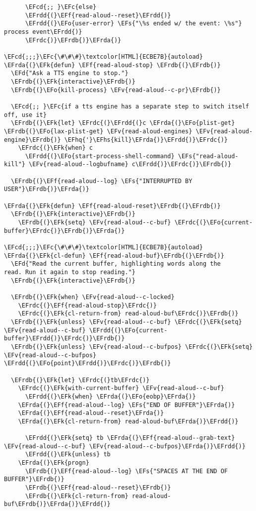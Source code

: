 \documentclass[a4wide,10pt]{article}
\newcommand{\EFc}[1]{\textcolor{EFc}{#1}} %
\newcommand{\EFcd}[1]{\textcolor{EFcd}{#1}} %
\newcommand{\EFs}[1]{\textcolor{EFs}{#1}} %
\newcommand{\EFd}[1]{\textcolor{EFd}{#1}} %
\newcommand{\EFk}[1]{\textcolor{EFk}{#1}} %
\newcommand{\EFf}[1]{\textcolor{EFf}{#1}} %
\newcommand{\EFv}[1]{\textcolor{EFv}{#1}} %
\newcommand{\EFo}[1]{\textcolor{EFo}{#1}} %
\newcommand{\EFhq}[1]{\textcolor{EFhq}{#1}} %
\newcommand{\EFhs}[1]{\textcolor{EFhs}{#1}} %
\newcommand{\EFrda}[1]{\textcolor{EFrda}{#1}} %
\newcommand{\EFrdb}[1]{\textcolor{EFrdb}{#1}} %
\newcommand{\EFrdc}[1]{\textcolor{EFrdc}{#1}} %
\newcommand{\EFrdd}[1]{\textcolor{EFrdd}{#1}} %
\begin{document}
\begin{Code}
\begin{Verbatim}
      \EFcd{;; }\EFc{else}
      \EFrdd{(}\EFf{read-aloud--reset}\EFrdd{)}
      \EFrdd{(}\EFo{user-error} \EFs{"\%s ended w/ the event: \%s"} process event\EFrdd{)}
      \EFrdc{)}\EFrdb{)}\EFrda{)}

\EFcd{;;;}\EFc{\#\#\#}\textcolor[HTML]{ECBE7B}{autoload}
\EFrda{(}\EFk{defun} \EFf{read-aloud-stop} \EFrdb{(}\EFrdb{)}
  \EFd{"Ask a TTS engine to stop."}
  \EFrdb{(}\EFk{interactive}\EFrdb{)}
  \EFrdb{(}\EFo{kill-process} \EFv{read-aloud--c-pr}\EFrdb{)}

  \EFcd{;; }\EFc{if a tts engine has a separate step to switch itself off, use it}
  \EFrdb{(}\EFk{let} \EFrdc{(}\EFrdd{(}c \EFrda{(}\EFo{plist-get} \EFrdb{(}\EFo{lax-plist-get} \EFv{read-aloud-engines} \EFv{read-aloud-engine}\EFrdb{)} \EFhq{'}\EFhs{kill}\EFrda{)}\EFrdd{)}\EFrdc{)}
    \EFrdc{(}\EFk{when} c
      \EFrdd{(}\EFo{start-process-shell-command} \EFs{"read-aloud-kill"} \EFv{read-aloud--logbufname} c\EFrdd{)}\EFrdc{)}\EFrdb{)}

  \EFrdb{(}\EFf{read-aloud--log} \EFs{"INTERRUPTED BY USER"}\EFrdb{)}\EFrda{)}

\EFrda{(}\EFk{defun} \EFf{read-aloud-reset}\EFrdb{(}\EFrdb{)}
  \EFrdb{(}\EFk{interactive}\EFrdb{)}
    \EFrdb{(}\EFk{setq} \EFv{read-aloud--c-buf} \EFrdc{(}\EFo{current-buffer}\EFrdc{)}\EFrdb{)}\EFrda{)}

\EFcd{;;;}\EFc{\#\#\#}\textcolor[HTML]{ECBE7B}{autoload}
\EFrda{(}\EFk{cl-defun} \EFf{read-aloud-buf}\EFrdb{(}\EFrdb{)}
  \EFd{"Read the current buffer, highlighting words along the
read. Run it again to stop reading."}
  \EFrdb{(}\EFk{interactive}\EFrdb{)}

  \EFrdb{(}\EFk{when} \EFv{read-aloud--c-locked}
    \EFrdc{(}\EFf{read-aloud-stop}\EFrdc{)}
    \EFrdc{(}\EFk{cl-return-from} read-aloud-buf\EFrdc{)}\EFrdb{)}
  \EFrdb{(}\EFk{unless} \EFv{read-aloud--c-buf} \EFrdc{(}\EFk{setq} \EFv{read-aloud--c-buf} \EFrdd{(}\EFo{current-buffer}\EFrdd{)}\EFrdc{)}\EFrdb{)}
  \EFrdb{(}\EFk{unless} \EFv{read-aloud--c-bufpos} \EFrdc{(}\EFk{setq} \EFv{read-aloud--c-bufpos} \EFrdd{(}\EFo{point}\EFrdd{)}\EFrdc{)}\EFrdb{)}

  \EFrdb{(}\EFk{let} \EFrdc{(}tb\EFrdc{)}
    \EFrdc{(}\EFk{with-current-buffer} \EFv{read-aloud--c-buf}
      \EFrdd{(}\EFk{when} \EFrda{(}\EFo{eobp}\EFrda{)}
	\EFrda{(}\EFf{read-aloud--log} \EFs{"END OF BUFFER"}\EFrda{)}
	\EFrda{(}\EFf{read-aloud--reset}\EFrda{)}
	\EFrda{(}\EFk{cl-return-from} read-aloud-buf\EFrda{)}\EFrdd{)}

      \EFrdd{(}\EFk{setq} tb \EFrda{(}\EFf{read-aloud--grab-text} \EFv{read-aloud--c-buf} \EFv{read-aloud--c-bufpos}\EFrda{)}\EFrdd{)}
      \EFrdd{(}\EFk{unless} tb
	\EFrda{(}\EFk{progn}
	  \EFrdb{(}\EFf{read-aloud--log} \EFs{"SPACES AT THE END OF BUFFER"}\EFrdb{)}
	  \EFrdb{(}\EFf{read-aloud--reset}\EFrdb{)}
	  \EFrdb{(}\EFk{cl-return-from} read-aloud-buf\EFrdb{)}\EFrda{)}\EFrdd{)}


\end{Verbatim}
\end{Code}
\end{document}
